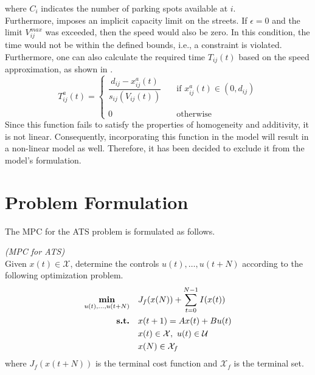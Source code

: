 where $C_i$ indicates the number of parking spots available at $i$. \\
Furthermore,  imposes an implicit capacity limit on the streets. If $\epsilon=0$ and the limit $V^{max}_{ij}$ was exceeded, then the speed would also be zero. In this condition, the time would not be within the defined bounds, i.e., a constraint is violated. \\
Furthermore, one can also calculate the required time $T_{ij}(t)$ based on the speed approximation, as shown in . 
\begin{equation}
	T_{ij}^a(t) = \begin{cases}
			\dfrac{d_{ij} - x^a_{ij}(t)}{s_{ij}(V_{ij}(t))} &\quad \text{if } x_{ij}^a(t) \in (0,d_{ij})\\
			&\\
			0 &\quad\text{otherwise }
		\end{cases}
	\label{eq:required_time} 
\end{equation}
Since this function fails to satisfy the properties of homogeneity and additivity, it is not linear. Consequently, incorporating this function in the model will result in a non-linear model as well. Therefore, it has been decided to exclude it from the model's formulation.

\section{Problem Formulation}\label{sec:prob_formulat_mpc}
The MPC for the ATS problem is formulated as follows. \\
\begin{definition}{\textit{(MPC for ATS) \\}}
	Given $x(t) \in \mathcal{X}$, determine the controls $u(t), \dots, u(t+N)$ according to the following optimization problem.
	\begin{equation}
		\begin{aligned}
			\underset{\substack{u(t), \dots, u(t+N)}}{\text{\textbf{min}}} \quad & J_f(x(N))+\sum_{t=0}^{N-1}I(x(t)) \\
			\text{\textbf{s.t.}} \quad & x(t+1) = Ax(t) + Bu(t) \\
			& x(t) \in \mathcal{X}, \ u(t)\in \mathcal{U} \\
			&x(N) \in \mathcal{X}_f\\
		\end{aligned}
		\label{eq:mpc_ats}
	\end{equation}
	where $J_f(x(t+N))$ is the terminal cost function and $\mathcal{X}_f$ is the terminal set. \\
\end{definition}


